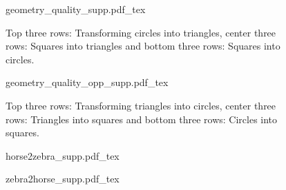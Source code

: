 \begin{figure*}[!htbp]
    \centering
    \begin{subfigure}[b]{\textwidth}
        \def\svgwidth{\textwidth}
            {geometry_quality_supp.pdf_tex}
        \caption{Top three rows: Transforming circles into triangles, center three rows: Squares into triangles and bottom three rows: Squares into circles.}
        \label{fig:geomaquality_supp}
    \end{subfigure}
    \end{figure*}
    \newpage
    \begin{figure*}[!htbp]\ContinuedFloat
    \begin{subfigure}[b]{\textwidth}
        \def\svgwidth{\textwidth}
            {geometry_quality_opp_supp.pdf_tex}
        \caption{Top three rows: Transforming triangles into circles, center three rows: Triangles into squares and bottom three rows: Circles into squares.}
        \label{fig:geomaquality_op_supp}
    \end{subfigure}
    \caption[Additional qualitative results for the shapes dataset]{We show additional qualitative comparisons of CycleGAN, InstaGAN and our method. We can see that our method transforms foreground objects more concisely. InstaGAN translation of the label masks in the Squares $\to$ Triangle case (center rows) leads to mode collapse. CycleGAN suffers from visual artifacts. CycleGAN and InstaGAN both struggle when the network has to generate object contours that are larger than the original objects (triangle to squares).}
\end{figure*}


\begin{figure*}[hbpt]
    \centering
     \begin{subfigure}[b]{\textwidth}
     \centering
    \def\svgwidth{\textwidth}
       {horse2zebra_supp.pdf_tex}
       \end{subfigure}
       \label{fig:horse2zebra_supp}
       \end{figure*}
    \newpage
    \begin{figure*}[!htbp]\ContinuedFloat
       \begin{subfigure}[b]{\textwidth}
     \centering
    \def\svgwidth{\textwidth}
       {zebra2horse_supp.pdf_tex}
       \end{subfigure}
    \caption[Additional results on Horse$\leftrightarrow$Zebra.]{Additional results on Horse$\leftrightarrow$Zebra. Top: Horse $\to$ Zebra. Bottom: Zebra $\to$ Horse. As noted before, adding a label preserving loss aids the preservation of background and the translations of color, texture and geometry of the foreground object.}
\end{figure*}




